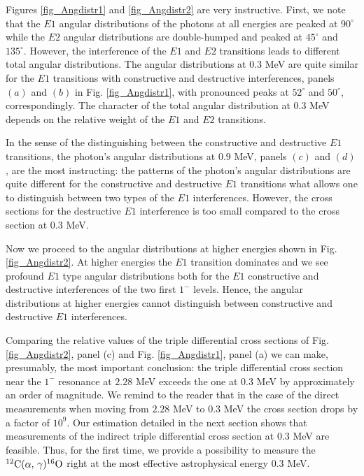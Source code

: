 \documentclass[prl,unsortedaddress,groupedaddress,twocolumn,amsmath,amsfonts,amssymb,showpacs,floatfix,nofootinbib]{revtex4}
\begin{document}
Figures \ref{fig_Angdistr1} and \ref{fig_Angdistr2} are very instructive. 
First, we note that the $E1$ angular distributions of the photons at all energies are peaked at $90^{\circ}$ while the $E2$ angular distributions are double-humped and peaked at $45^{\circ}$ and $135^{\circ}$. However, the interference of the $E1$ and $E2$ transitions leads to different total angular distributions.
The angular distributions at $0.3$ MeV are quite similar for the $E1$ transitions with constructive and destructive interferences, panels $(a)$ and $(b)$ in Fig. \ref{fig_Angdistr1}, with pronounced peaks at $52^{\circ}$ and $50^{\circ}$, correspondingly. The character of the total angular distribution at $0.3$ MeV depends on the relative weight of the $E1$ and $E2$ transitions.

In the sense of the distinguishing between the constructive and destructive $E1$ transitions,  the photon's angular distributions at $0.9$ MeV, panels $(c)$ and $(d)$, are the most instructing: the patterns of the photon's angular distributions are quite different for the constructive and destructive $E1$ transitions what allows one to distinguish between two types of the $E1$ interferences. However, the cross sections for the destructive $E1$ interference is too small compared to the cross section at $0.3$ MeV.

Now we proceed to the angular distributions at higher energies shown in Fig. \ref{fig_Angdistr2}. At higher energies the $E1$ transition dominates and we see profound $E1$ type angular distributions both for the $E1$ constructive and destructive interferences of the two first $1^{-}$ levels. Hence, the angular distributions at higher energies cannot distinguish between constructive and destructive $E1$ interferences.

Comparing the relative values of the triple differential cross sections 
of Fig. \ref{fig_Angdistr2}, panel (c) and Fig. \ref{fig_Angdistr1}, panel (a) we can make, presumably, the most important conclusion: 
the triple differential cross section near the $1^{-}$ resonance at $2.28$ MeV exceeds the one at $0.3$ MeV by approximately an order of magnitude. We remind to the reader that in the case of the direct measurements when moving from $2.28$ MeV to $0.3$ MeV the cross section drops by a factor of  $10^{9}$. Our estimation detailed in the next section shows that measurements of the indirect triple differential cross section at $0.3$ MeV are feasible. Thus, for the first time, we provide a possibility  to measure the ${}^{12}{\rm C}(\alpha,\,\gamma){}^{16}{\rm O}$ right at the most effective astrophysical energy $0.3$ MeV.  
\end{document}
